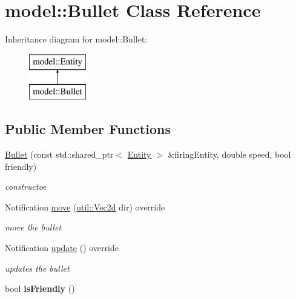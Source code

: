\hypertarget{classmodel_1_1_bullet}{}\section{model\+:\+:Bullet Class Reference}
\label{classmodel_1_1_bullet}
Inheritance diagram for model\+:\+:Bullet\+:\begin{figure}[H]
\begin{center}
\leavevmode
\includegraphics[height=2.000000cm]{d9/db7/classmodel_1_1_bullet}
\end{center}
\end{figure}
\subsection*{Public Member Functions}
\begin{DoxyCompactItemize}
\item 
\mbox{\hyperlink{classmodel_1_1_bullet_ae3a0d97b7b599dea243314e7b2c33291}{Bullet}} (const std\+::shared\+\_\+ptr$<$ \mbox{\hyperlink{classmodel_1_1_entity}{Entity}} $>$ \&firing\+Entity, double speed, bool friendly)
\begin{DoxyCompactList}\small\item\em constructoe \end{DoxyCompactList}\item 
Notification \mbox{\hyperlink{classmodel_1_1_bullet_a6f2cb490e361ab9d45f83f29dcaabe21}{move}} (\mbox{\hyperlink{classutil_1_1_vec2}{util\+::\+Vec2d}} dir) override
\begin{DoxyCompactList}\small\item\em move the bullet \end{DoxyCompactList}\item 
Notification \mbox{\hyperlink{classmodel_1_1_bullet_ac3e89bf8732f061ae9c4c92b7fce2680}{update}} () override
\begin{DoxyCompactList}\small\item\em updates the bullet \end{DoxyCompactList}\item 
\mbox{\label{classmodel_1_1_bullet_ad3f385ac944df19911b685413d1edc94}} 
bool {\bfseries is\+Friendly} ()
\end{DoxyCompactItemize}

